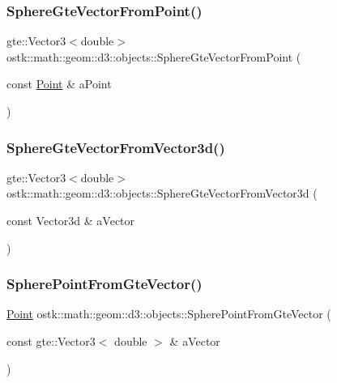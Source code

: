 \subsubsection{\texorpdfstring{Sphere\+Gte\+Vector\+From\+Point()}{SphereGteVectorFromPoint()}}
{\footnotesize\ttfamily gte\+::\+Vector3$<$double$>$ ostk\+::math\+::geom\+::d3\+::objects\+::\+Sphere\+Gte\+Vector\+From\+Point (\begin{DoxyParamCaption}\item[{const \hyperlink{classostk_1_1math_1_1geom_1_1d3_1_1objects_1_1_point}{Point} \&}]{a\+Point }\end{DoxyParamCaption})}

\mbox{\label{namespaceostk_1_1math_1_1geom_1_1d3_1_1objects_a994fd988c1cb50ee37d241e56be9829c}} 
\subsubsection{\texorpdfstring{Sphere\+Gte\+Vector\+From\+Vector3d()}{SphereGteVectorFromVector3d()}}
{\footnotesize\ttfamily gte\+::\+Vector3$<$double$>$ ostk\+::math\+::geom\+::d3\+::objects\+::\+Sphere\+Gte\+Vector\+From\+Vector3d (\begin{DoxyParamCaption}\item[{const Vector3d \&}]{a\+Vector }\end{DoxyParamCaption})}

\mbox{\label{namespaceostk_1_1math_1_1geom_1_1d3_1_1objects_a0305d0045730dca82b7129534cedbf8e}} 
\subsubsection{\texorpdfstring{Sphere\+Point\+From\+Gte\+Vector()}{SpherePointFromGteVector()}}
{\footnotesize\ttfamily \hyperlink{classostk_1_1math_1_1geom_1_1d3_1_1objects_1_1_point}{Point} ostk\+::math\+::geom\+::d3\+::objects\+::\+Sphere\+Point\+From\+Gte\+Vector (\begin{DoxyParamCaption}\item[{const gte\+::\+Vector3$<$ double $>$ \&}]{a\+Vector }\end{DoxyParamCaption})}

